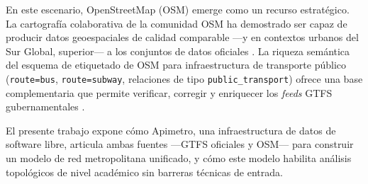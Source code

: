 En este escenario, OpenStreetMap (OSM) emerge como un recurso estratégico.  La
cartografía colaborativa de la comunidad OSM ha demostrado ser capaz de producir
datos geoespaciales de calidad comparable ---y en contextos urbanos del Sur Global,
superior--- a los conjuntos de datos oficiales \citep{haklay2010good,
barrington2017world}.  La riqueza semántica del esquema de etiquetado de OSM para
infraestructura de transporte público (\texttt{route=bus}, \texttt{route=subway},
relaciones de tipo \texttt{public\_transport}) ofrece una base complementaria que
permite verificar, corregir y enriquecer los \textit{feeds} GTFS gubernamentales
\citep{luxen2011realtime}.

El presente trabajo expone cómo Apimetro, una infraestructura de datos de software
libre, articula ambas fuentes ---GTFS oficiales y OSM--- para construir un modelo
de red metropolitana unificado, y cómo este modelo habilita análisis topológicos
de nivel académico sin barreras técnicas de entrada.
